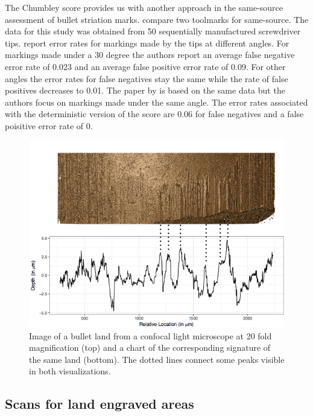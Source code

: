 \documentclass[12pt]{article}
\begin{document}
The Chumbley score provides us with another approach in the same-source
assessment of bullet striation marks. \citet{chumbley} compare two
toolmarks for same-source. The data for this study was obtained from 50
sequentially manufactured screwdriver tips. \citet{chumbley} report
error rates for markings made by the tips at different angles. For
markings made under a 30 degree the authors report an average false
negative error rate of 0.023 and an average false positive error rate of
0.09. For other angles the error rates for false negatives stay the same
while the rate of false positives decreases to 0.01.
 The paper by \citet{hadler} is based on the
same data but the authors focus on markings made under the same angle.
The error rates associated with the deterministic version of the score
are 0.06 for false negatives and a false poisitive error rate of 0.

\begin{figure}
\centering
\includegraphics[width=\textwidth]{images/B6-B2-L6-rescaled.png}


\caption{\label{fig:rgl} Image of a bullet land from a confocal light microscope at 20 fold magnification (top) and a chart of the corresponding signature of the same land (bottom). The dotted lines connect some peaks visible in both visualizations.}

\end{figure}

\subsection{Scans for land engraved
areas}\label{scans-for-land-engraved-areas}
\end{document}
